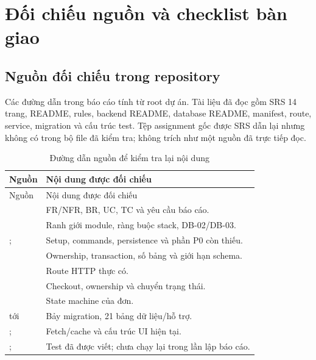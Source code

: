 \clearpage
\appendix
\section{Đối chiếu nguồn và checklist bàn giao}
\begingroup\small
\subsection{Nguồn đối chiếu trong repository}
Các đường dẫn trong báo cáo tính từ root dự án. Tài liệu đã đọc gồm SRS 14 trang, README, rules, backend README, database README, manifest, route, service, migration và cấu trúc test. Tệp assignment gốc được SRS dẫn lại nhưng không có trong bộ file đã kiểm tra; không trích như một nguồn đã trực tiếp đọc.
\begin{longtable}{@{}P{8cm}P{6.5cm}@{}}
\caption{Đường dẫn nguồn để kiểm tra lại nội dung}\label{tab:evidence}\\
\toprule Nguồn & Nội dung được đối chiếu\\\midrule\endfirsthead
\toprule Nguồn & Nội dung được đối chiếu\\\midrule\endhead
{} & FR/NFR, BR, UC, TC và yêu cầu báo cáo.\\
 & Ranh giới module, ràng buộc stack, DB-02/DB-03.\\
;  & Setup, commands, persistence và phần P0 còn thiếu.\\
 & Ownership, transaction, số bảng và giới hạn schema.\\
 & Route HTTP thực có.\\
 & Checkout, ownership và chuyển trạng thái.\\
 & State machine của đơn.\\
 tới  & Bảy migration, 21 bảng dữ liệu/hỗ trợ.\\
;  & Fetch/cache và cấu trúc UI hiện tại.\\
;  & Test đã được viết; chưa chạy lại trong lần lập báo cáo.\\
\bottomrule\end{longtable}

